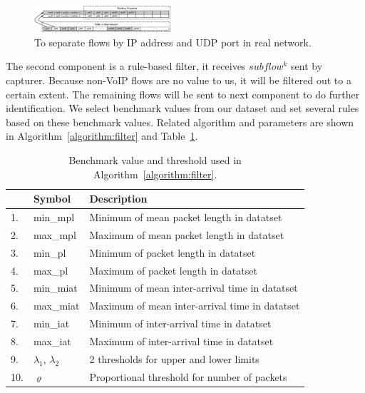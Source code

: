 \documentclass[conference]{IEEEtran}
\begin{document}
\begin{figure}[htp]
\begin{center}
\includegraphics[width=0.45\textwidth]{flow.eps}
\caption{To separate flows by IP address and UDP port in real network.}\label{fig:flow}
\end{center}
\end{figure}

The second component is a rule-based filter, it receives $subflow^k$ sent by capturer. Because non-VoIP flows are no value to us, it will be filtered out to a certain extent. The remaining flows will be sent to next component to do further identification. We select benchmark values from our dataset and set several rules based on these benchmark values. Related algorithm and parameters are shown in Algorithm~\ref{algorithm:filter} and Table~\ref{tab:rules}.

\begin{table}[htbp]
  \caption{Benchmark value and threshold used in Algorithm~\ref{algorithm:filter}.}
  \label{tab:rules}
  \centering
  \begin{tabular}{l l l}
    \hline
    \textbf{} & \textbf{Symbol} & \textbf{Description}\\
    \hline
    1. & min\_mpl      &   Minimum of mean packet length in datatset\\
    2. & max\_mpl      &  Maximum of mean packet length in datatset\\
    3. & min\_pl      &   Minimum of packet length in datatset\\
    4. & max\_pl      &   Maximum of packet length in datatset\\
    5. & min\_miat      &   Minimum of mean inter-arrival time in datatset\\
    6. & max\_miat      &   Maximum of mean inter-arrival time in datatset\\
    7. & min\_iat      &   Minimum of inter-arrival time in datatset\\
    8. & max\_iat      &  Maximum of inter-arrival time in datatset\\
    9. & ${\lambda_1}$, ${\lambda_2}$      &  2 thresholds for upper and lower limits \\
    10. & ${\varrho}$    &   Proportional threshold for number of packets\\
    \hline
  \end{tabular}
\end{table}
\end{document}

